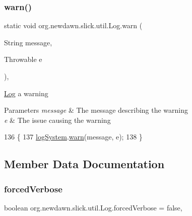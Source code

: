 \subsubsection{\texorpdfstring{warn()}{warn()}\hspace{0.1cm}{\footnotesize\ttfamily [2/2]}}
{\footnotesize\ttfamily static void org.\+newdawn.\+slick.\+util.\+Log.\+warn (\begin{DoxyParamCaption}\item[{String}]{message,  }\item[{Throwable}]{e }\end{DoxyParamCaption})\hspace{0.3cm}{\ttfamily [inline]}, {\ttfamily [static]}}

\mbox{\hyperlink{classorg_1_1newdawn_1_1slick_1_1util_1_1_log}{Log}} a warning


\begin{DoxyParams}{Parameters}
{\em message} & The message describing the warning \\
\hline
{\em e} & The issue causing the warning \\
\hline
\end{DoxyParams}

\begin{DoxyCode}
136                                                          \{
137         \mbox{\hyperlink{classorg_1_1newdawn_1_1slick_1_1util_1_1_log_acca32268a2a183e671051b4b9188cc72}{logSystem}}.\mbox{\hyperlink{interfaceorg_1_1newdawn_1_1slick_1_1util_1_1_log_system_a4c4f5a96667389bbca64c86f63272b7d}{warn}}(message, e);
138     \}
\end{DoxyCode}


\subsection{Member Data Documentation}
\mbox{\label{classorg_1_1newdawn_1_1slick_1_1util_1_1_log_ac5c775f540d68914085b57d8ac1868f8}} 
\subsubsection{\texorpdfstring{forced\+Verbose}{forcedVerbose}}
{\footnotesize\ttfamily boolean org.\+newdawn.\+slick.\+util.\+Log.\+forced\+Verbose = false\hspace{0.3cm}{\ttfamily [static]}, {\ttfamily [private]}}

